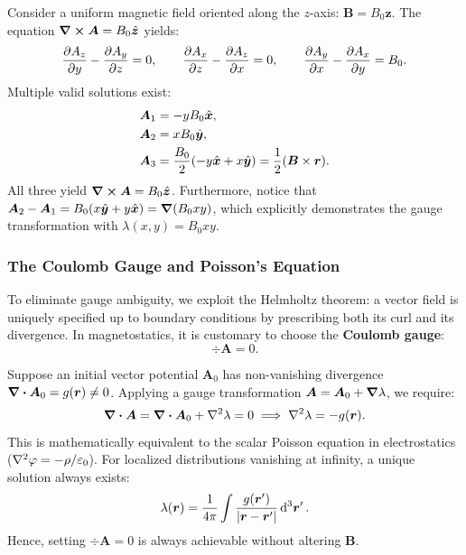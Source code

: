 \begin{example}
    Consider a uniform magnetic field oriented along the $z$-axis: $\bm{B} = B_0 \hat{\bm{z}}$. The equation $\curl \bm{A} = B_0 \hat{\bm{z}}$ yields:
    \begin{equation}
        \pdv{A_z}{y} - \pdv{A_y}{z} = 0, \qquad \pdv{A_x}{z} - \pdv{A_z}{x} = 0, \qquad \pdv{A_y}{x} - \pdv{A_x}{y} = B_0.
    \end{equation}
    Multiple valid solutions exist:
    \begin{align}
        \bm{A}_1 &= -y B_0 \hat{\bm{x}}, \\
        \bm{A}_2 &= x B_0 \hat{\bm{y}}, \\
        \bm{A}_3 &= \frac{B_0}{2} (-y \hat{\bm{x}} + x \hat{\bm{y}}) = \frac{1}{2}(\bm{B}\times \bm{r}).
    \end{align}
    All three yield $\curl \bm{A} = B_0 \hat{\bm{z}}$. Furthermore, notice that $\bm{A}_2 - \bm{A}_1 = B_0(x\hat{\bm{y}} + y\hat{\bm{x}}) = \grad(B_0 x y)$, which explicitly demonstrates the gauge transformation with $\lambda(x,y) = B_0 x y$.
\end{example}

\subsubsection{The Coulomb Gauge and Poisson's Equation}

To eliminate gauge ambiguity, we exploit the Helmholtz theorem: a vector field is uniquely specified up to boundary conditions by prescribing both its curl and its divergence. In magnetostatics, it is customary to choose the \textbf{Coulomb gauge}:
\begin{equation}
    \div \bm{A} = 0.
\end{equation}

\begin{remark}
    Suppose an initial vector potential $\bm{A}_0$ has non-vanishing divergence $\div \bm{A}_0 = g(\bm{r}) \neq 0$. Applying a gauge transformation $\bm{A} = \bm{A}_0 + \grad \lambda$, we require:
    \begin{equation}
        \div \bm{A} = \div \bm{A}_0 + \laplacian \lambda = 0 \implies \laplacian \lambda = -g(\gr).
    \end{equation}
    This is mathematically equivalent to the scalar Poisson equation in electrostatics ($\laplacian \varphi = -\rho/\varepsilon_0$). For localized distributions vanishing at infinity, a unique solution always exists:
    \begin{equation}
        \lambda(\bm{r}) = \frac{1}{4\pi} \int \frac{g(\bm{r}')}{|\bm{r} - \bm{r}'|} \dd[3]{\bm{r}'}.
    \end{equation}
    Hence, setting $\div \bm{A} = 0$ is always achievable without altering $\bm{B}$.
\end{remark}

